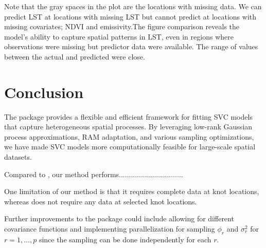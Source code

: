  Note that the gray spaces in the plot are the locations with missing data. We can predict LST at locations with missing LST but cannot predict at locations with missing covariates; NDVI and emissivity.The figure comparison reveals the model’s ability to capture spatial patterns in LST, even in regions where observations were missing but predictor data were available.
 The range of values between the actual and predicted were close.
 
\section{Conclusion}
\label{sec:Conclusion}
The  package provides a flexible and efficient framework for fitting SVC models that capture heterogeneous spatial processes. By leveraging low-rank Gaussian process approximations, RAM adaptation, and various sampling optimizations, we have made SVC models more computationally feasible for large-scale spatial datasets.

Compared to , our method performs................................

One limitation of our method is that it requires complete data at knot locations, whereas  does not require any data at selected knot locations.

Further improvements to the package could include allowing for different covariance functions and implementing parallelization for sampling $\phi_r$ and $\sigma_r^2$ for $r = 1, \dots, p$ since the sampling can be done independently for each $r$.

\newpage




 
